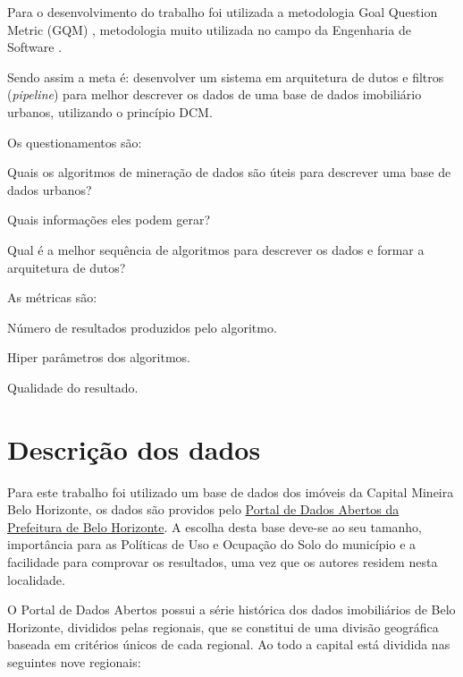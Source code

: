 \documentclass[12pt]{article}
\begin{document}
Para o desenvolvimento do trabalho foi utilizada a metodologia Goal Question Metric (GQM) \cite{caldiera1994goal}, metodologia muito utilizada no campo da Engenharia de Software \cite{sommerville2011software}. 

Sendo assim a meta é: desenvolver um sistema em arquitetura de dutos e filtros (\textit{pipeline}) para melhor descrever os dados de uma base de dados imobiliário urbanos, utilizando o princípio DCM. 

Os questionamentos são:
\begin{questions}
        \item Quais os algoritmos de mineração de dados são úteis para descrever uma base de dados urbanos?
        \item Quais informações eles podem gerar?
        \item Qual é a melhor sequência de algoritmos para descrever os dados e formar a arquitetura de dutos?
\end{questions}

As métricas são: 
\begin{metrics}
        \item Número de resultados produzidos pelo algoritmo.
        \item Hiper parâmetros dos algoritmos.
        \item Qualidade do resultado.
\end{metrics}
\section{Descrição dos dados}
Para este trabalho foi utilizado um base de dados dos imóveis da Capital Mineira Belo Horizonte, os dados são providos pelo \href{https://dados.pbh.gov.br/}{Portal de Dados Abertos da Prefeitura de Belo Horizonte}. A escolha desta base deve-se ao seu tamanho, importância para as Políticas de Uso e Ocupação do Solo do município e a facilidade para comprovar os resultados, uma vez que os autores residem nesta localidade. 

O Portal de Dados Abertos possui a série histórica dos dados imobiliários de Belo Horizonte, divididos pelas regionais, que se constitui de uma divisão geográfica baseada em critérios únicos de cada regional. Ao todo a capital está dividida nas seguintes nove regionais:
\end{document}
